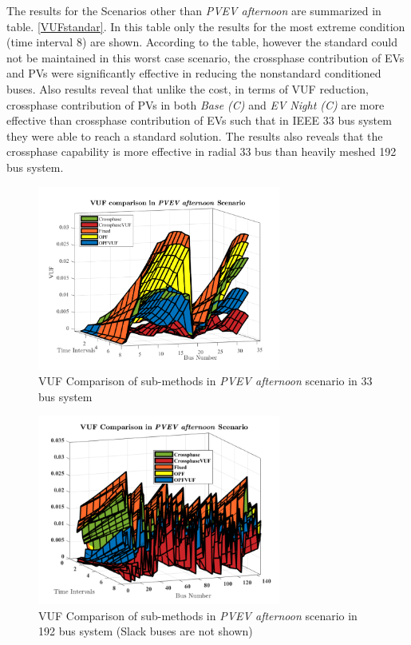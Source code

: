 \documentclass[journal]{IEEEtran}
\begin{document}
The results for the Scenarios other than \textit{PVEV afternoon} are summarized in table. \ref{VUFstandar}. In this table only the results for the most extreme condition (time interval 8) are shown. According to the table, however the standard could not be maintained in this worst case scenario, the crossphase contribution of EVs and PVs were significantly effective in reducing the nonstandard conditioned buses. Also results reveal that unlike the cost, in terms of VUF reduction, crossphase contribution of PVs in both \textit{Base (C)} and \textit{EV Night (C)} are more effective than crossphase contribution of EVs such that in IEEE 33 bus system they were able to reach a standard solution. The results also reveals that the crossphase capability is more effective in radial 33 bus than heavily meshed 192 bus system.
\begin{figure}
\centering
\includegraphics[width=8cm]{pdf/VUF33m.pdf}
\vspace*{-0.3cm}
\caption{VUF Comparison of sub-methods in \textit{PVEV afternoon} scenario in 33 bus system}
\label{VUF33m}
\end{figure}
\begin{figure}
\centering
\includegraphics[width=8cm]{pdf/VUF192m.pdf}
\vspace*{-0.3cm}
\caption{VUF Comparison of sub-methods in \textit{PVEV afternoon} scenario in 192 bus system (Slack buses are not shown)}
\label{VUF192m}
\end{figure}
\end{document}

